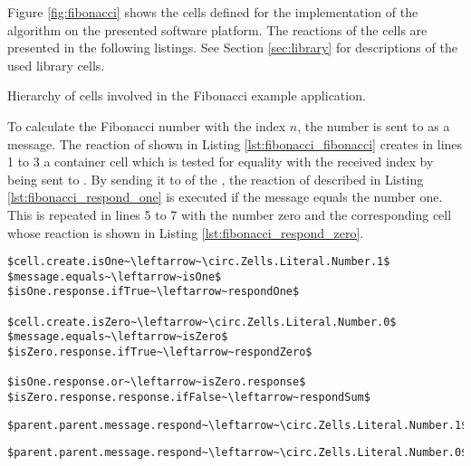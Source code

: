 Figure \ref{fig:fibonacci} shows the cells defined for the implementation of the algorithm on the presented software platform. The reactions of the cells are presented in the following listings. See Section \ref{sec:library} for descriptions of the used library cells.

{Hierarchy of cells involved in the Fibonacci example application.}

To calculate the Fibonacci number with the index $n$, the number is sent to  as a message. The reaction of  shown in Listing \ref{lst:fibonacci_fibonacci} creates in lines 1 to 3 a container cell  which is tested for equality with the received index by being sent to . By sending it to  of the , the reaction of  described in Listing \ref{lst:fibonacci_respond_one} is executed if the message equals the number one. This is repeated in lines 5 to 7 with the number zero and the corresponding cell  whose reaction is shown in Listing \ref{lst:fibonacci_respond_zero}.

\begin{lstlisting}[mathescape, float=hbt, label=lst:fibonacci_fibonacci, 
caption=Reaction of \cell{Fibonacci} cell]
$cell.create.isOne~\leftarrow~\circ.Zells.Literal.Number.1$
$message.equals~\leftarrow~isOne$
$isOne.response.ifTrue~\leftarrow~respondOne$

$cell.create.isZero~\leftarrow~\circ.Zells.Literal.Number.0$
$message.equals~\leftarrow~isZero$
$isZero.response.ifTrue~\leftarrow~respondZero$

$isOne.response.or~\leftarrow~isZero.response$
$isZero.response.response.ifFalse~\leftarrow~respondSum$
\end{lstlisting}

\begin{lstlisting}[mathescape, float=htb, label=lst:fibonacci_respond_one, 
caption=Reaction of \cell{Fibonacci.respondOne} cell]
$parent.parent.message.respond~\leftarrow~\circ.Zells.Literal.Number.1$
\end{lstlisting}

\begin{lstlisting}[mathescape, float=htb, label=lst:fibonacci_respond_zero, 
caption=Reaction of \cell{Fibonacci.respondZero} cell]
$parent.parent.message.respond~\leftarrow~\circ.Zells.Literal.Number.0$
\end{lstlisting}

